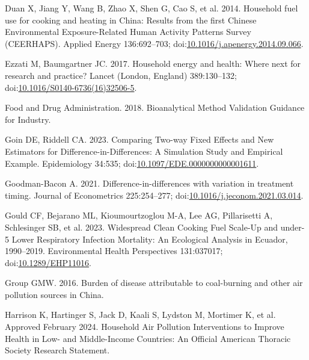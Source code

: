 \documentclass[
  letterpaper,
  DIV=11,
  numbers=noendperiod]{scrartcl}
\newlength{\cslhangindent}
\newlength{\cslentryspacingunit} %
\newenvironment{CSLReferences}[2] %
 {%
  \setlength{\parindent}{0pt}
  \ifodd #1
  \let\oldpar\par
  \def\par{\hangindent=\cslhangindent\oldpar}
  \fi
  \setlength{\parskip}{#2\cslentryspacingunit}
 }%
 {}
\begin{document}
\begin{CSLReferences}{1}{0}
\leavevmode{}%
Duan X, Jiang Y, Wang B, Zhao X, Shen G, Cao S, et al. 2014. Household
fuel use for cooking and heating in {China}: {Results} from the first
{Chinese Environmental Exposure-Related Human Activity Patterns Survey}
({CEERHAPS}). Applied Energy 136:692--703;
doi:\href{https://doi.org/10.1016/j.apenergy.2014.09.066}{10.1016/j.apenergy.2014.09.066}.

\leavevmode{}%
Ezzati M, Baumgartner JC. 2017. Household energy and health: Where next
for research and practice? Lancet (London, England) 389:130--132;
doi:\href{https://doi.org/10.1016/S0140-6736(16)32506-5}{10.1016/S0140-6736(16)32506-5}.

\leavevmode{}%
Food and Drug Administration. 2018. Bioanalytical {Method Validation
Guidance} for {Industry}.

\leavevmode{}%
Goin DE, Riddell CA. 2023. Comparing {Two-way Fixed Effects} and {New
Estimators} for {Difference-in-Differences}: {A Simulation Study} and
{Empirical Example}. Epidemiology 34:535;
doi:\href{https://doi.org/10.1097/EDE.0000000000001611}{10.1097/EDE.0000000000001611}.

\leavevmode{}%
Goodman-Bacon A. 2021. Difference-in-differences with variation in
treatment timing. Journal of Econometrics 225:254--277;
doi:\href{https://doi.org/10.1016/j.jeconom.2021.03.014}{10.1016/j.jeconom.2021.03.014}.

\leavevmode{}%
Gould CF, Bejarano ML, Kioumourtzoglou M-A, Lee AG, Pillarisetti A,
Schlesinger SB, et al. 2023. Widespread {Clean Cooking Fuel Scale-Up}
and under-5 {Lower Respiratory Infection Mortality}: {An Ecological
Analysis} in {Ecuador}, 1990--2019. Environmental Health Perspectives
131:037017;
doi:\href{https://doi.org/10.1289/EHP11016}{10.1289/EHP11016}.

\leavevmode{}%
Group GMW. 2016. Burden of disease attributable to coal-burning and
other air pollution sources in {China}.

\leavevmode{}%
Harrison K, Hartinger S, Jack D, Kaali S, Lydston M, Mortimer K, et al.
Approved February 2024. Household {Air Pollution Interventions} to
{Improve Health} in {Low-} and {Middle-Income Countries}: {An Official
American Thoracic Society Research Statement}.


\end{CSLReferences}
\end{document}
